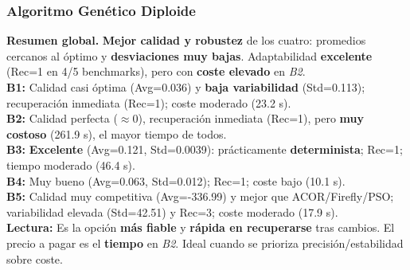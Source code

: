 \documentclass[10pt,twocolumn]{article}
\begin{document}
\begin{table}[H]
\centering
\caption{Algoritmo Genético Diploide: resultados promedios por benchmark.}
\label{tab:ga-diploide}
\scriptsize
{}
\end{table}

\subsubsection*{Algoritmo Genético Diploide}
\textbf{Resumen global.} \textbf{Mejor calidad y robustez} de los cuatro: promedios cercanos al óptimo y \textbf{desviaciones muy bajas}. Adaptabilidad \textbf{excelente} (Rec=1 en 4/5 benchmarks), pero con \textbf{coste elevado} en \textit{B2}. \\
\textbf{B1:} Calidad casi óptima (Avg=0.036) y \textbf{baja variabilidad} (Std=0.113); recuperación inmediata (Rec=1); coste moderado (23.2 s). \\
\textbf{B2:} Calidad perfecta ($\approx 0$), recuperación inmediata (Rec=1), pero \textbf{muy costoso} (261.9 s), el mayor tiempo de todos. \\
\textbf{B3:} \textbf{Excelente} (Avg=0.121, Std=0.0039): prácticamente \textbf{determinista}; Rec=1; tiempo moderado (46.4 s). \\
\textbf{B4:} Muy bueno (Avg=0.063, Std=0.012); Rec=1; coste bajo (10.1 s). \\
\textbf{B5:} Calidad muy competitiva (Avg=-336.99) y mejor que ACOR/Firefly/PSO; variabilidad elevada (Std=42.51) y Rec=3; coste moderado (17.9 s). \\
\textbf{Lectura:} Es la opción \textbf{más fiable} y \textbf{rápida en recuperarse} tras cambios. El precio a pagar es el \textbf{tiempo} en \textit{B2}. Ideal cuando se prioriza precisión/estabilidad sobre coste.
\end{document}
